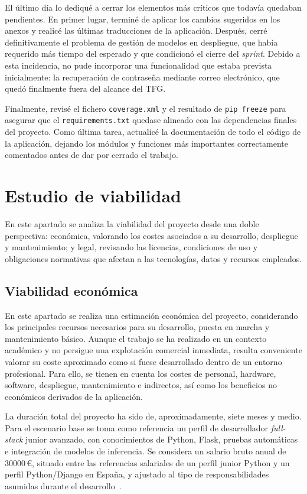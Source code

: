 El último día lo dediqué a cerrar los elementos más críticos que todavía quedaban pendientes. En primer lugar, terminé de aplicar los cambios sugeridos en los anexos y realicé las últimas traducciones de la aplicación. Después, cerré definitivamente el problema de gestión de modelos en despliegue, que había requerido más tiempo del esperado y que condicionó el cierre del \textit{sprint}. Debido a esta incidencia, no pude incorporar una funcionalidad que estaba prevista inicialmente: la recuperación de contraseña mediante correo electrónico, que quedó finalmente fuera del alcance del TFG.

Finalmente, revisé el fichero \texttt{coverage.xml} y el resultado de \texttt{pip freeze} para asegurar que el \texttt{requirements.txt} quedase alineado con las dependencias finales del proyecto. Como última tarea, actualicé la documentación de todo el código de la aplicación, dejando los módulos y funciones más importantes correctamente comentados antes de dar por cerrado el trabajo.

\section{Estudio de viabilidad}
En este apartado se analiza la viabilidad del proyecto desde una doble perspectiva: económica, valorando los costes asociados a su desarrollo, despliegue y mantenimiento; y legal, revisando las licencias, condiciones de uso y obligaciones normativas que afectan a las tecnologías, datos y recursos empleados.

\subsection{Viabilidad económica}

En este apartado se realiza una estimación económica del proyecto, considerando los principales recursos necesarios para su desarrollo, puesta en marcha y mantenimiento básico. Aunque el trabajo se ha realizado en un contexto académico y no persigue una explotación comercial inmediata, resulta conveniente valorar su coste aproximado como si fuese desarrollado dentro de un entorno profesional. Para ello, se tienen en cuenta los costes de personal, hardware, software, despliegue, mantenimiento e indirectos, así como los beneficios no económicos derivados de la aplicación.

La duración total del proyecto ha sido de, aproximadamente, siete meses y medio. Para el escenario base se toma como referencia un perfil de desarrollador \textit{full-stack} junior avanzado, con conocimientos de Python, Flask, pruebas automáticas e integración de modelos de inferencia. Se considera un salario bruto anual de \num{30000}\,€, situado entre las referencias salariales de un perfil junior Python y un perfil Python/Django en España, y ajustado al tipo de responsabilidades asumidas durante el desarrollo~\cite{glassdoor_python_developer_spain_2026}.

